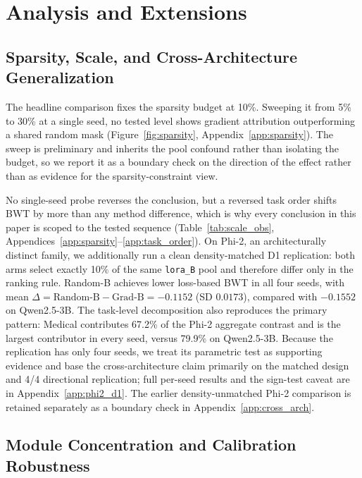 \section{Analysis and Extensions}
\label{sec:analysis}

\subsection{Sparsity, Scale, and Cross-Architecture Generalization}
\label{sec:boundaries}

The headline comparison fixes the sparsity budget at 10\%. Sweeping it from 5\% to 30\% at a single seed, no tested level shows gradient attribution outperforming a shared random mask (Figure~\ref{fig:sparsity}, Appendix~\ref{app:sparsity}). The sweep is preliminary and inherits the pool confound rather than isolating the budget, so we report it as a boundary check on the direction of the effect rather than as evidence for the sparsity-constraint view.

No single-seed probe reverses the conclusion, but a reversed task order shifts BWT by more than any method difference, which is why every conclusion in this paper is scoped to the tested sequence (Table~\ref{tab:scale_obs}, Appendices~\ref{app:sparsity}--\ref{app:task_order}). On Phi-2, an architecturally distinct family, we additionally run a clean density-matched D1 replication: both arms select exactly 10\% of the same \texttt{lora\_B} pool and therefore differ only in the ranking rule. Random-B achieves lower loss-based BWT in all four seeds, with mean $\Delta=\text{Random-B}-\text{Grad-B}=-0.1152$ (SD $0.0173$), compared with $-0.1552$ on Qwen2.5-3B. The task-level decomposition also reproduces the primary pattern: Medical contributes 67.2\% of the Phi-2 aggregate contrast and is the largest contributor in every seed, versus 79.9\% on Qwen2.5-3B. Because the replication has only four seeds, we treat its parametric test as supporting evidence and base the cross-architecture claim primarily on the matched design and 4/4 directional replication; full per-seed results and the sign-test caveat are in Appendix~\ref{app:phi2_d1}. The earlier density-unmatched Phi-2 comparison is retained separately as a boundary check in Appendix~\ref{app:cross_arch}.

\subsection{Module Concentration and Calibration Robustness}
\label{sec:module}

